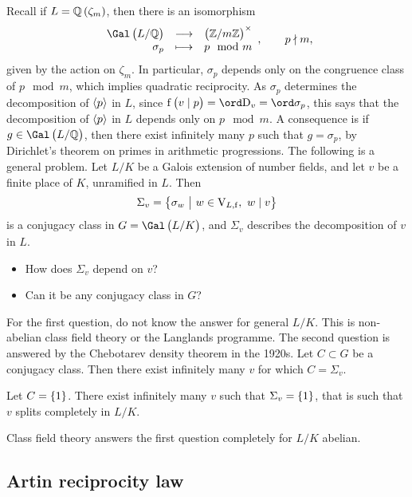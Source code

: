 
Recall if $ L = \QQ\br{\zeta_m} $, then there is an isomorphism
$$ \function{\Gal\br{L / \QQ}}{\br{\ZZ / m\ZZ}^\times}{\sigma_p}{p \mod m}, \qquad p \nmid m, $$
given by the action on $ \zeta_m $. In particular, $ \sigma_p $ depends only on the congruence class of $ p \mod m $, which implies quadratic reciprocity. As $ \sigma_p $ determines the decomposition of $ \left\langle p \right\rangle $ in $ L $, since $ \f\br{v \mid p} = \ord \D_v = \ord \sigma_p $, this says that the decomposition of $ \left\langle p \right\rangle $ in $ L $ depends only on $ p \mod m $. A consequence is if $ g \in \Gal\br{L / \QQ} $, then there exist infinitely many $ p $ such that $ g = \sigma_p $, by Dirichlet's theorem on primes in arithmetic progressions. The following is a general problem. Let $ L / K $ be a Galois extension of number fields, and let $ v $ be a finite place of $ K $, unramified in $ L $. Then
$$ \Sigma_v = \cbr{\sigma_w \st w \in \V_{L, \f}, \ w \mid v} $$
is a conjugacy class in $ G = \Gal\br{L / K} $, and $ \Sigma_v $ describes the decomposition of $ v $ in $ L $.
\begin{itemize}
\item How does $ \Sigma_v $ depend on $ v $?
\item Can it be any conjugacy class in $ G $?
\end{itemize}

For the first question, do not know the answer for general $ L / K $. This is non-abelian class field theory or the Langlands programme. The second question is answered by the Chebotarev density theorem in the 1920s. Let $ C \subset G $ be a conjugacy class. Then there exist infinitely many $ v $ for which $ C = \Sigma_v $.

\begin{example*}
Let $ C = \cbr{1} $. There exist infinitely many $ v $ such that $ \Sigma_v = \cbr{1} $, that is such that $ v $ splits completely in $ L / K $.
\end{example*}

Class field theory answers the first question completely for $ L / K $ abelian.

\subsection{Artin reciprocity law}

